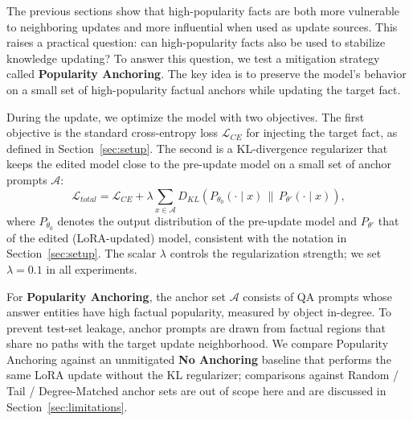 The previous sections show that high-popularity facts are both more vulnerable to neighboring updates and more influential when used as update sources. This raises a practical question: can high-popularity facts also be used to stabilize knowledge updating? To answer this question, we test a mitigation strategy called \textbf{Popularity Anchoring}. The key idea is to preserve the model's behavior on a small set of high-popularity factual anchors while updating the target fact.

During the update, we optimize the model with two objectives. The first objective is the standard cross-entropy loss $\mathcal{L}_{CE}$ for injecting the target fact, as defined in Section~\ref{sec:setup}. The second is a KL-divergence regularizer that keeps the edited model close to the pre-update model on a small set of anchor prompts $\mathcal{A}$:
\begin{equation}
\mathcal{L}_{total}
=
\mathcal{L}_{CE}
+
\lambda
\sum_{x \in \mathcal{A}}
D_{KL}
\!\left(
P_{\theta_0}(\cdot \mid x)
\,\|\,
P_{\theta'}(\cdot \mid x)
\right),
\label{eq:popularity_anchoring}
\end{equation}
where $P_{\theta_0}$ denotes the output distribution of the pre-update model and $P_{\theta'}$ that of the edited (LoRA-updated) model, consistent with the notation in Section~\ref{sec:setup}. The scalar $\lambda$ controls the regularization strength; we set $\lambda=0.1$ in all experiments.

For \textbf{Popularity Anchoring}, the anchor set $\mathcal{A}$ consists of QA prompts whose answer entities have high factual popularity, measured by object in-degree. To prevent test-set leakage, anchor prompts are drawn from factual regions that share no paths with the target update neighborhood. We compare Popularity Anchoring against an unmitigated \textbf{No Anchoring} baseline that performs the same LoRA update without the KL regularizer; comparisons against Random / Tail / Degree-Matched anchor sets are out of scope here and are discussed in Section~\ref{sec:limitations}.

